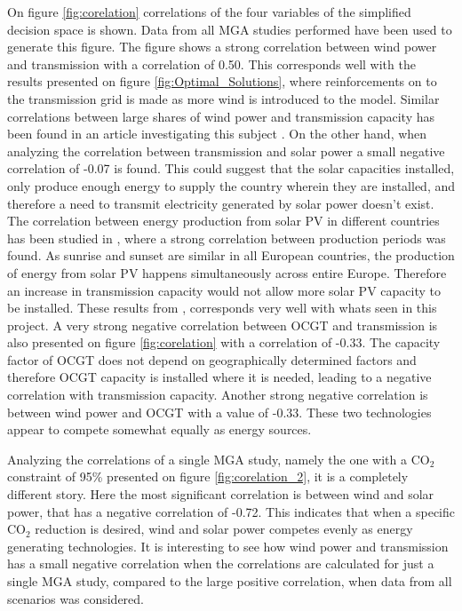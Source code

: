On figure \ref{fig:corelation} correlations of the four variables of the simplified decision space is shown. Data from all MGA studies performed have been used to generate this figure. 
The figure shows a strong correlation between wind power and transmission with a correlation of 0.50. This corresponds well with the results presented on figure \ref{fig:Optimal_Solutions}, where reinforcements on to the transmission grid is made as more wind is introduced to the model. Similar correlations between large shares of wind power and transmission capacity has been found in an article investigating this subject \cite{PURVINS20111461}. On the other hand, when analyzing the correlation between transmission and solar power a small negative correlation of -0.07 is found. This could suggest that the solar capacities installed, only produce enough energy to supply the country wherein they are installed, and therefore a need to transmit electricity generated by solar power doesn't exist. The correlation between energy production from solar PV in different countries has been studied in \cite{SolarPV_transmission}, where a strong correlation between production periods was found. As sunrise and sunset are similar in all European countries, the production of energy from solar PV happens simultaneously across entire Europe. Therefore an increase in transmission capacity would not allow more solar PV capacity to be installed. These results from \cite{SolarPV_transmission}, corresponds very well with whats seen in this project. 
A very strong negative correlation between OCGT and transmission is also presented on figure \ref{fig:corelation} with a correlation of -0.33. The capacity factor of OCGT does not depend on geographically determined factors and therefore OCGT capacity is installed where it is needed, leading to a negative correlation with transmission capacity.  
Another strong negative correlation is between wind power and OCGT with a value of -0.33. These two technologies appear to compete somewhat equally as energy sources.  


Analyzing the correlations of a single MGA study, namely the one with a $\text{CO}_2$ constraint of 95\% presented on figure \ref{fig:corelation_2}, it is a completely different story. Here the most significant correlation is between wind and solar power, that has a negative correlation of -0.72. This indicates that when a specific $\text{CO}_2$ reduction is desired, wind and solar power competes evenly as energy generating technologies. 
It is interesting to see how wind power and transmission has a small negative correlation when the correlations are calculated for just a single MGA study, compared to the large positive correlation, when data from all scenarios was considered. 


